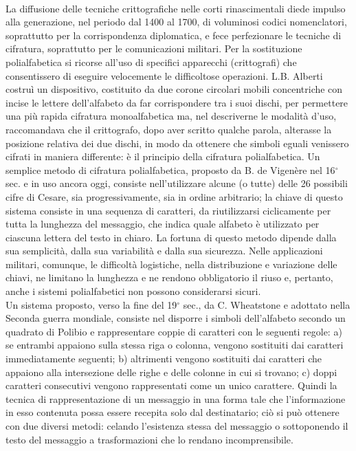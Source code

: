 \documentclass[a4paper,12pt]{tesiinfo}
\begin{document}
\\
La diffusione delle tecniche crittografiche nelle corti rinascimentali diede impulso alla generazione, nel periodo dal 1400 al 1700, di voluminosi codici nomenclatori, soprattutto per la corrispondenza diplomatica, e fece perfezionare le tecniche di cifratura, soprattutto per le comunicazioni militari.  Per la sostituzione polialfabetica si ricorse  all'uso di specifici apparecchi (crittografi) che consentissero di eseguire velocemente le difficoltose operazioni. L.B. Alberti costru\`i un dispositivo, costituito da due corone circolari mobili concentriche con incise  le lettere dell'alfabeto da far corrispondere tra i suoi dischi, per permettere una pi\`u rapida cifratura monoalfabetica ma, nel descriverne le modalit\`a d'uso, raccomandava che il crittografo, dopo aver scritto qualche parola, alterasse la posizione relativa dei due dischi, in modo da ottenere che simboli eguali venissero cifrati in maniera differente: \`e il principio della cifratura polialfabetica.
Un semplice metodo di cifratura polialfabetica, proposto da B. de Vigen\`ere nel 16$^\circ$ sec. e in uso ancora oggi, consiste nell'utilizzare alcune (o tutte) delle 26 possibili cifre di Cesare, sia progressivamente, sia in ordine arbitrario; la chiave di questo sistema consiste in una sequenza di caratteri, da riutilizzarsi ciclicamente per tutta la lunghezza del messaggio, che indica quale alfabeto \`e utilizzato per ciascuna lettera del testo in chiaro. La fortuna di questo metodo dipende dalla sua semplicit\`a, dalla sua variabilit\`a e dalla sua sicurezza. Nelle applicazioni militari, comunque, le difficolt\`a logistiche, nella distribuzione e variazione delle chiavi, ne limitano la lunghezza e ne rendono obbligatorio il riuso e, pertanto, anche i sistemi polialfabetici non possono considerarsi sicuri.
\\
Un sistema proposto, verso la fine del 19$^\circ$ sec., da  C. Wheatstone e adottato nella Seconda guerra mondiale, consiste nel disporre i simboli dell'alfabeto secondo un quadrato di  Polibio e rappresentare coppie di caratteri con le seguenti regole: a) se entrambi appaiono sulla stessa riga o colonna, vengono sostituiti dai caratteri immediatamente seguenti; b) altrimenti vengono sostituiti dai caratteri che appaiono alla intersezione delle righe e delle colonne in cui si trovano; c) doppi caratteri consecutivi vengono rappresentati come un unico carattere. Quindi la  tecnica di rappresentazione di un messaggio in una forma tale che l'informazione in esso contenuta possa essere recepita solo dal destinatario; ci\`o si pu\`o ottenere con due diversi metodi: celando l'esistenza stessa del messaggio o sottoponendo il testo del messaggio a trasformazioni che lo rendano incomprensibile. 
\end{document}
